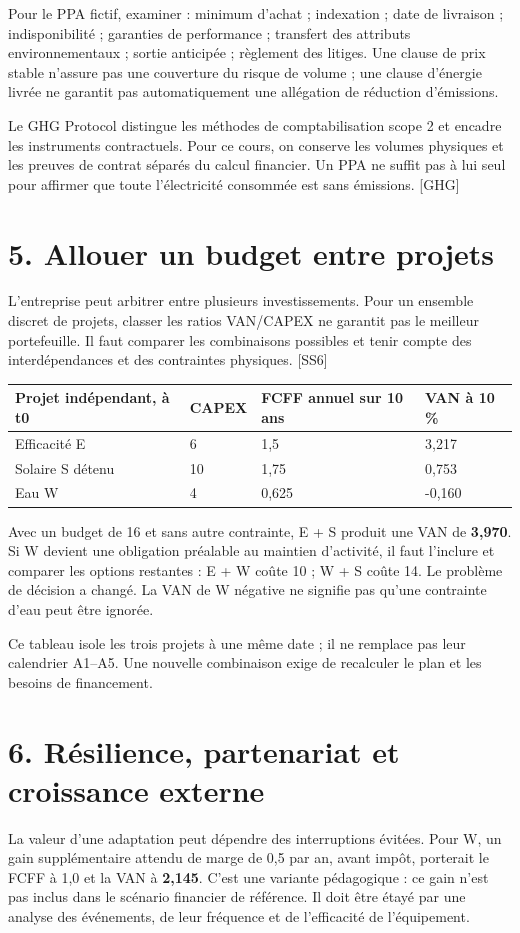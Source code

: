 \documentclass[12pt,a4paper]{article}
\begin{document}
Pour le PPA fictif, examiner : minimum d’achat ; indexation ; date de livraison ; indisponibilité ; garanties de performance ; transfert des attributs environnementaux ; sortie anticipée ; règlement des litiges. Une clause de prix stable n’assure pas une couverture du risque de volume ; une clause d’énergie livrée ne garantit pas automatiquement une allégation de réduction d’émissions.


Le GHG Protocol distingue les méthodes de comptabilisation scope 2 et encadre les instruments contractuels. Pour ce cours, on conserve les volumes physiques et les preuves de contrat séparés du calcul financier. Un PPA ne suffit pas à lui seul pour affirmer que toute l’électricité consommée est sans émissions. [GHG]

\section*{5. Allouer un budget entre projets}
L’entreprise peut arbitrer entre plusieurs investissements. Pour un ensemble discret de projets, classer les ratios VAN/CAPEX ne garantit pas le meilleur portefeuille. Il faut comparer les combinaisons possibles et tenir compte des interdépendances et des contraintes physiques. [SS6]



\Needspace{180pt}
\begin{longtable}{p{3.67cm}p{3.67cm}p{3.67cm}p{3.67cm}}
\toprule
Projet indépendant, à t0 & CAPEX & FCFF annuel sur 10 ans & VAN à 10 \% \\
\midrule\endhead
Efficacité E & 6 & 1,5 & 3,217 \\
Solaire S détenu & 10 & 1,75 & 0,753 \\
Eau W & 4 & 0,625 & -0,160 \\
\bottomrule
\end{longtable}

Avec un budget de 16 et sans autre contrainte, E + S produit une VAN de \textbf{3,970}. Si W devient une obligation préalable au maintien d’activité, il faut l’inclure et comparer les options restantes : E + W coûte 10 ; W + S coûte 14. Le problème de décision a changé. La VAN de W négative ne signifie pas qu’une contrainte d’eau peut être ignorée.


Ce tableau isole les trois projets à une même date ; il ne remplace pas leur calendrier A1--A5. Une nouvelle combinaison exige de recalculer le plan et les besoins de financement.

\section*{6. Résilience, partenariat et croissance externe}
La valeur d’une adaptation peut dépendre des interruptions évitées. Pour W, un gain supplémentaire attendu de marge de 0,5 par an, avant impôt, porterait le FCFF à 1,0 et la VAN à \textbf{2,145}. C’est une variante pédagogique : ce gain n’est pas inclus dans le scénario financier de référence. Il doit être étayé par une analyse des événements, de leur fréquence et de l’efficacité de l’équipement.
\end{document}
